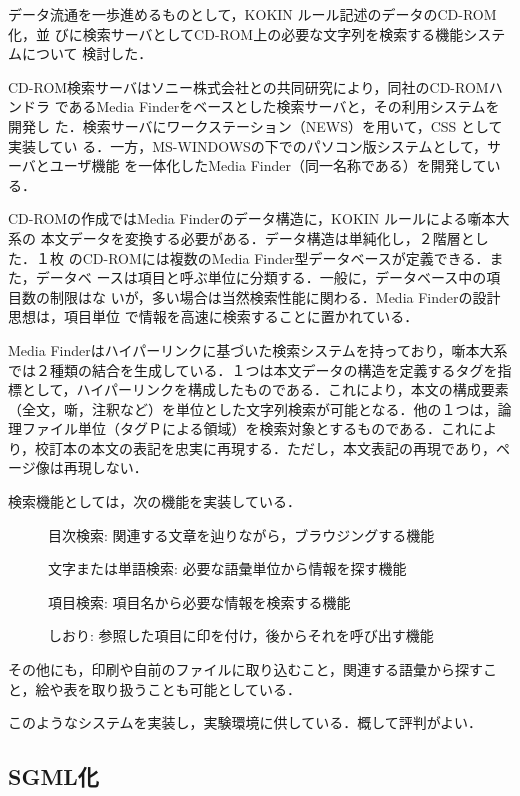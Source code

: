 データ流通を一歩進めるものとして，KOKIN ルール記述のデータのCD-ROM化，並
びに検索サーバとしてCD-ROM上の必要な文字列を検索する機能システムについて
検討した．

CD-ROM検索サーバはソニー株式会社との共同研究により，同社のCD-ROMハンドラ
であるMedia Finderをベースとした検索サーバと，その利用システムを開発し
た．検索サーバにワークステーション（NEWS）を用いて，CSS として実装してい
る．一方，MS-WINDOWSの下でのパソコン版システムとして，サーバとユーザ機能
を一体化したMedia Finder（同一名称である）を開発している．

CD-ROMの作成ではMedia Finderのデータ構造に，KOKIN ルールによる噺本大系の
本文データを変換する必要がある．データ構造は単純化し，２階層とした．１枚
のCD-ROMには複数のMedia Finder型データベースが定義できる．また，データベ
ースは項目と呼ぶ単位に分類する．一般に，データベース中の項目数の制限はな
いが，多い場合は当然検索性能に関わる．Media Finderの設計思想は，項目単位
で情報を高速に検索することに置かれている．

Media Finderはハイパーリンクに基づいた検索システムを持っており，噺本大系
では２種類の結合を生成している．１つは本文データの構造を定義するタグを指
標として，ハイパーリンクを構成したものである．これにより，本文の構成要素
（全文，噺，注釈など）を単位とした文字列検索が可能となる．他の１つは，論
理ファイル単位（タグＰによる領域）を検索対象とするものである．これによ
り，校訂本の本文の表記を忠実に再現する．ただし，本文表記の再現であり，ペ
ージ像は再現しない．

検索機能としては，次の機能を実装している．
\smallskip
\begin{description}
\item[] 目次検索: 関連する文章を辿りながら，ブラウジングする機能
\item[] 文字または単語検索: 必要な語彙単位から情報を探す機能
\item[] 項目検索: 項目名から必要な情報を検索する機能
\item[] しおり: 参照した項目に印を付け，後からそれを呼び出す機能
\end{description}
\smallskip
その他にも，印刷や自前のファイルに取り込むこと，関連する語彙から探すこ
と，絵や表を取り扱うことも可能としている．

このようなシステムを実装し，実験環境に供している．概して評判がよい．


\subsection{SGML化}
\label{sec:5.3setu}

